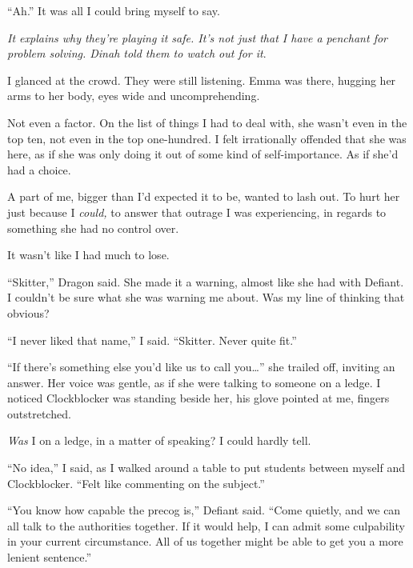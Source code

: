 ``Ah.''  It was all I could bring myself to say.



\emph{It explains why they're playing it safe.  It's not just that I have a penchant for problem solving.  Dinah told them to watch out for it}.



I glanced at the crowd.  They were still listening.  Emma was there, hugging her arms to her body, eyes wide and uncomprehending.



Not even a factor.  On the list of things I had to deal with, she wasn't even in the top ten, not even in the top one-hundred.  I felt irrationally offended that she was here, as if she was only doing it out of some kind of self-importance.  As if she'd had a choice.



A part of me, bigger than I'd expected it to be, wanted to lash out.  To hurt her just because I \emph{could, }to answer that outrage I was experiencing, in regards to something she had no control over.



It wasn't like I had much to lose.



``Skitter,'' Dragon said.  She made it a warning, almost like she had with Defiant.  I couldn't be sure what she was warning me about.  Was my line of thinking that obvious?



``I never liked that name,'' I said.  ``Skitter.  Never quite fit.''



``If there's something else you'd like us to call you\ldots'' she trailed off, inviting an answer.  Her voice was gentle, as if she were talking to someone on a ledge.  I noticed Clockblocker was standing beside her, his glove pointed at me, fingers outstretched.



\emph{Was} I on a ledge, in a matter of speaking?  I could hardly tell.



``No idea,'' I said, as I walked around a table to put students between myself and Clockblocker. ``Felt like commenting on the subject.''



``You know how capable the precog is,'' Defiant said.  ``Come quietly, and we can all talk to the authorities together.  If it would help, I can admit some culpability in your current circumstance.  All of us together might be able to get you a more lenient sentence.''



